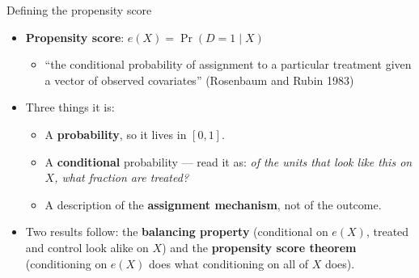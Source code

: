 \documentclass[
  11pt,
  ignorenonframetext,
  aspectratio=169,
]{beamer}
\providecommand{\tightlist}{%
  \setlength{\itemsep}{0pt}\setlength{\parskip}{0pt}}
\begin{document}
\begin{frame}{Defining the propensity score}
\protect{}\label{defining-the-propensity-score}
\begin{itemize}
\tightlist
\item
  \textbf{Propensity score}: \(e(X) = \Pr(D = 1 \mid X)\)

  \begin{itemize}
  \tightlist
  \item
    ``the conditional probability of assignment to a particular
    treatment given a vector of observed covariates'' (Rosenbaum and
    Rubin 1983)
  \end{itemize}
\item
  Three things it is:

  \begin{itemize}
  \tightlist
  \item
    A \textbf{probability}, so it lives in \([0,1]\).
  \item
    A \textbf{conditional} probability --- read it as: \emph{of the
    units that look like this on \(X\), what fraction are treated?}
  \item
    A description of the \textbf{assignment mechanism}, not of the
    outcome.
  \end{itemize}
\item
  Two results follow: the \textbf{balancing property} (conditional on
  \(e(X)\), treated and control look alike on \(X\)) and the
  \textbf{propensity score theorem} (conditioning on \(e(X)\) does what
  conditioning on all of \(X\) does).
\end{itemize}
\end{frame}
\end{document}
